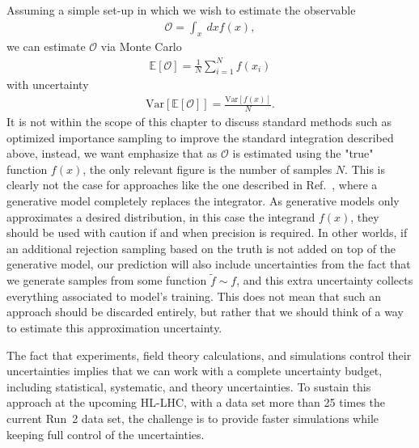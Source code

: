 Assuming a simple set-up in which we wish to estimate the observable
\begin{align}
\mathcal{O} = \int_x ~ dx f(x),
\end{align}
we can estimate $\mathcal{O}$ via Monte Carlo
\begin{align}
\mathbb{E}\left[\mathcal{O}\right] = \frac{1}{N} \sum_{i=1}^N f(x_i)
\end{align}
with uncertainty
\begin{align}
\text{Var}\left[\mathbb{E}\left[\mathcal{O}\right] \right] = \frac{\text{Var}\left[ f(x)\right]}{N}.
\end{align}
It is not within the scope of this chapter to discuss standard methods such as optimized
importance sampling to improve the standard integration described above, instead, we
want emphasize that as $\mathcal{O}$ is estimated using the "true" function $f(x)$, the 
only relevant figure is the number of samples $N$.
This is clearly not the case for approaches like the one described in Ref.~\cite{gan_phasespace},
where a generative model completely replaces the integrator.
As generative models only approximates a desired distribution, in this case the 
integrand $f(x)$, they should be used with caution if and when precision is required.
In other worlds, if an additional rejection sampling based on the truth is not added on top
of the generative model, our prediction will also include uncertainties from the fact
that we generate samples from some function $\tilde{f} \sim f$, and this extra uncertainty
collects everything associated to model's training.
This does not mean that such an approach should be discarded entirely, but rather
that we should think of a way to estimate this approximation uncertainty.

The fact that experiments, field theory calculations, and simulations
control their uncertainties implies that we can work with a complete
uncertainty budget, including statistical, systematic, and theory
uncertainties. To sustain this approach at the upcoming HL-LHC, with a
data set more than 25 times the current Run~2 data set, the
challenge is to provide faster simulations while keeping full control of
the uncertainties.

